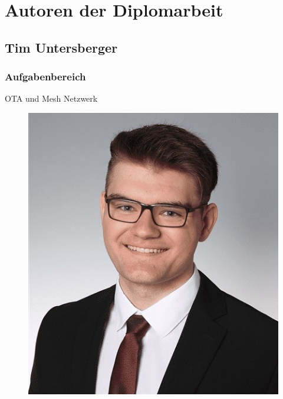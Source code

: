 \section*{Autoren der Diplomarbeit}
\subsection*{Tim Untersberger}
\subsubsection*{Aufgabenbereich}

OTA und Mesh Netzwerk

\begin{figure}[H]
	\includegraphics[scale=0.3]{images/tim_untersberger.jpg}
\end{figure}
